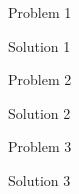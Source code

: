 \begin{problem}
  Problem 1
\end{problem}
\begin{solution}
  Solution 1
\end{solution}
\begin{problem}
  Problem 2
\end{problem}
\begin{solution}
  Solution 2
\end{solution}
\begin{problem}
  Problem 3
\end{problem}
\begin{solution}
  Solution 3
\end{solution}
